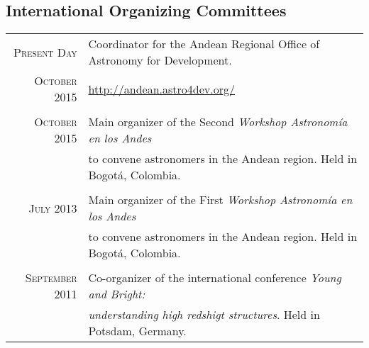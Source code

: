 \documentclass[a4paper,10pt]{article} %
\begin{document}
\subsection{International Organizing Committees}
\begin{tabular}{rl}	
 \textsc{Present Day} &  Coordinator for the Andean Regional Office of  Astronomy for Development.\\
 \textsc{October 2015} & \url{http://andean.astro4dev.org/}\\
& \\
 \textsc{October 2015} &  Main organizer of the Second
 \textit{Workshop Astronom\'ia en los Andes} \\
   & to convene astronomers in the Andean region.  Held in Bogot\'a, Colombia.\\
& \\
 \textsc{July 2013} &  Main organizer of the First
 \textit{Workshop Astronom\'ia en los Andes} \\
   & to convene astronomers in the Andean region.  Held in Bogot\'a, Colombia.\\
& \\
 \textsc{September 2011} &  Co-organizer of the international
 conference \textit{Young and Bright:}\\
 & \textit{understanding high redshigt structures}. Held in
 Potsdam, Germany.\\ 
\end{tabular}


\end{document}
